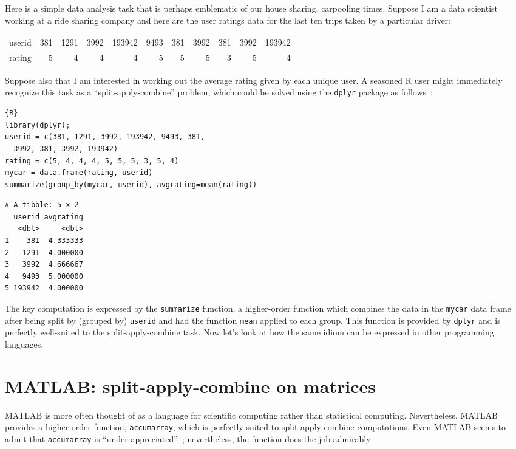\documentclass[11pt]{asaproc}
\begin{document}
Here is a simple data analysis task that is perhaps emblematic of our house
sharing, carpooling times. Suppose I am a data scientist working at a ride
sharing company and here are the user ratings data for the last ten trips taken
by a particular driver:

\begin{tabular}{r|rrrrrrrrrr}
userid &
381    & 1291   & 3992   & 193942 & 9493   &
381    & 3992   & 381    & 3992   & 193942 \tabularnewline
rating &
5 & 4 & 4 & 4 & 5 & 5 & 5 & 3 & 5 & 4
\end{tabular}

Suppose also that I am interested in working out the average rating given by
each unique user. A seasoned R user might immediately recognize this task
as a ``split-apply-combine'' problem, which could be solved using the
\lstinline|dplyr| package as follows~\citep{Wickham2011}:

\begin{lstlisting}{R}
library(dplyr);
userid = c(381, 1291, 3992, 193942, 9493, 381,
  3992, 381, 3992, 193942)
rating = c(5, 4, 4, 4, 5, 5, 5, 3, 5, 4)
mycar = data.frame(rating, userid)
summarize(group_by(mycar, userid), avgrating=mean(rating))
\end{lstlisting}
\begin{verbatim}
# A tibble: 5 x 2
  userid avgrating
   <dbl>     <dbl>
1    381  4.333333
2   1291  4.000000
3   3992  4.666667
4   9493  5.000000
5 193942  4.000000
\end{verbatim}

The key computation is expressed by the \lstinline|summarize| function, a
higher-order function which combines the data in the \lstinline|mycar| data
frame after being split by (grouped by) \lstinline|userid| and had the function
\lstinline|mean| applied to each group.  This function is provided by
\lstinline|dplyr| and is perfectly well-suited to the split-apply-combine task.
Now let's look at how the same idiom can be expressed in other programming
languages.



\section{MATLAB: split-apply-combine on matrices}

MATLAB is more often thought of as a language for scientific computing rather
than statistical computing. Nevertheless, MATLAB provides a higher order
function, \lstinline|accumarray|, which is perfectly suited to
split-apply-combine computations. Even MATLAB seems to admit that
\lstinline|accumarray| is ``under-appreciated''~\citep{underappreciated};
nevertheless, the function does the job admirably:
\end{document}
